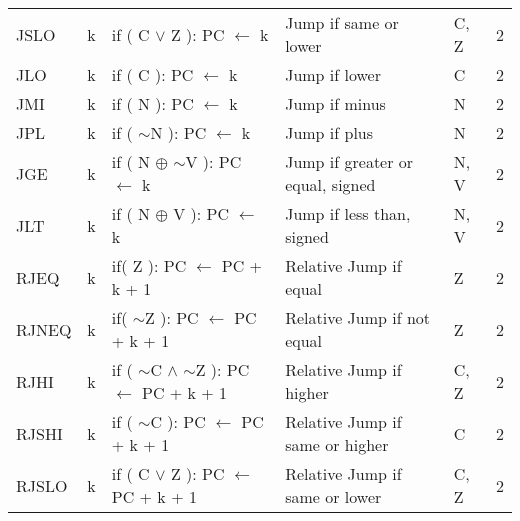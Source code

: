 \begin{footnotesize}
\begin{tabular}{|p{14.5mm}|p{14mm}|p{47mm}|p{46.5mm}|p{14mm}|p{10mm}|}
    JSLO     & k         & if ( C $\lor$ Z ): PC $\leftarrow$ k                                        & Jump if same or lower                     & C, Z           & 2      \\
    JLO      & k         & if ( C  ): PC $\leftarrow$ k                                           & Jump if lower                             & C              & 2      \\
    JMI      & k         & if ( N ): PC $\leftarrow$ k                                            & Jump if minus                             & N              & 2      \\
    JPL      & k         & if ( $\sim$N ): PC $\leftarrow$ k                                      & Jump if plus                              & N              & 2      \\
    JGE      & k         & if ( N $\oplus$ $\sim$V ): PC $\leftarrow$ k                                  & Jump if greater or equal, \newline signed         & N, V           & 2      \\
    JLT      & k         & if ( N $\oplus$ V ): PC $\leftarrow$ k                                        & Jump if less than, signed                & N, V           & 2      \\
    RJEQ     & k         & if( Z ): PC $\leftarrow$ PC + k + 1                                    & Relative Jump if equal                    & Z              & 2      \\
    RJNEQ    & k         & if( $\sim$Z ): PC $\leftarrow$ PC + k + 1                              & Relative Jump if not equal                & Z              & 2      \\
    RJHI     & k         & if ( $\sim$C $\land$ $\sim$Z ): \newline PC $\leftarrow$ PC + k + 1                   & Relative Jump if higher                   & C, Z           & 2      \\
    RJSHI    & k         & if ( $\sim$C ): \newline PC $\leftarrow$ PC + k + 1                             & Relative Jump if \newline same or higher           & C              & 2      \\
    RJSLO    & k         & if ( C $\lor$ Z ): \newline PC $\leftarrow$ PC + k + 1                               & Relative Jump if \newline same or lower            & C, Z           & 2      \\

\end{tabular}
\end{footnotesize}
